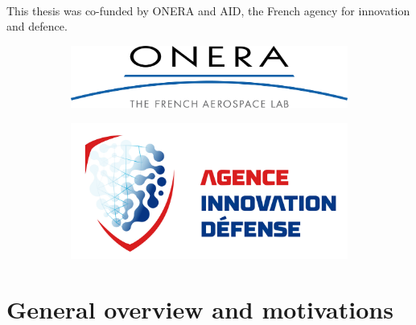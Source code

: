     \paragraph{}
    This thesis was co-funded by ONERA and AID, the French agency for innovation and defence.
    \begin{figure}[h]
      \centering
      \begin{subfigure}[c]{0.45\textwidth}
        \centering
        \includegraphics[width=\textwidth]{figures/logoONERA.png}
      \end{subfigure}
      \hfill
      \begin{subfigure}[c]{0.45\textwidth}
        \centering
        \includegraphics[width=\textwidth]{figures/logoAID.jpg}
      \end{subfigure}
    \end{figure}


  \section*{General overview and motivations}

